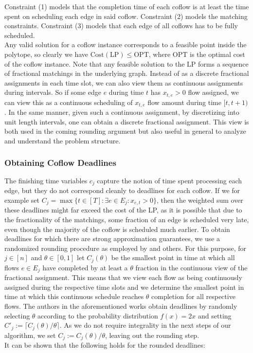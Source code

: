 \documentclass[11pt]{article}
\begin{document}
Constraint (1) models that the completion time of each coflow is at least the time spent on scheduling each edge in said coflow. Constraint (2) models the matching constraints. Constraint (3) models that each edge of all coflows has to be fully scheduled.\\
Any valid solution for a coflow instance corresponds to a feasible point inside the polytope, so clearly we have $\mathrm{Cost}(\mathrm{LP}) \le \mathrm{OPT}$, where $\mathrm{OPT}$ is the optimal cost of the coflow instance. Note that any feasible solution to the LP forms a sequence of fractional matchings in the underlying graph. Instead of as a discrete fractional assignments in each time slot, we can also view them as continuous assignments during intervals. So if some edge $e$ during time $t$ has $x_{t,e} > 0$ flow assigned, we can view this as a continuous scheduling of $x_{t,e}$ flow amount during time $[t,t+1)$. In the same manner, given such a continuous assignment, by discretizing into unit length intervals, one can obtain a discrete fractional assignment. This view is both used in the coming rounding argument but also useful in general to analyze and understand the problem structure. 

\subsubsection*{Obtaining Coflow Deadlines}
The finishing time variables $c_j$ capture the notion of time spent processing each edge, but they do not correspond cleanly to deadlines for each coflow. If we for example set $C_j = \max\{t \in [T]: \exists e \in E_j: x_{e,t} > 0\}$, then the weighted sum over these deadlines might far exceed the cost of the LP, as it is possible that due to the fractionality of the matchings, some fraction of an edge is scheduled very late, even though the majority of the coflow is scheduled much earlier. To obtain deadlines for which there are strong approximation guarantees, we use a randomized rounding procedure as employed by \cite{fukunaga22,im19} and others.
For this purpose, for $j \in [n]$ and $\theta \in [0,1]$ let $C_j(\theta)$ be the smallest point in time at which all flows $e \in E_j$ have completed by at least a $\theta$ fraction in the continuous view of the fractional assignment. This means that we view each flow as being continuously assigned during the respective time slots and we determine the smallest point in time at which this continuous schedule reaches $\theta$ completion for all respective flows. The authors in the aforementioned works obtain deadlines by randomly selecting $\theta$ according to the probability distribution $f(x)=2x$ and setting $C'_j := \lceil C_j(\theta)/\theta\rceil$. As we do not require integrality in the next steps of our algorithm, we set $C_j := C_j(\theta)/\theta$, leaving out the rounding step.\\
It can be shown that the following holds for the rounded deadlines:
\end{document}
